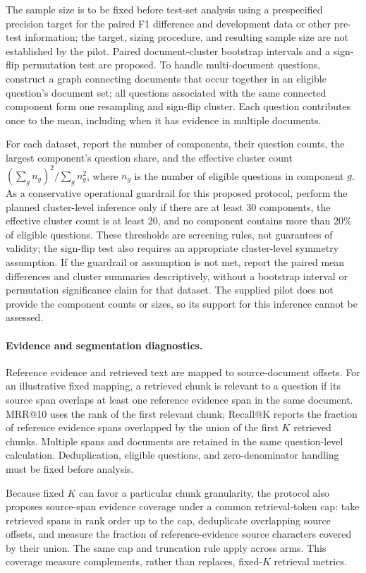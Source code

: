 \documentclass[10pt]{article}
\begin{document}
The sample size is to be fixed before test-set analysis using a prespecified precision target for the paired F1 difference and development data or other pre-test information; the target, sizing procedure, and resulting sample size are not established by the pilot. Paired document-cluster bootstrap intervals and a sign-flip permutation test are proposed. To handle multi-document questions, construct a graph connecting documents that occur together in an eligible question's document set; all questions associated with the same connected component form one resampling and sign-flip cluster. Each question contributes once to the mean, including when it has evidence in multiple documents.

For each dataset, report the number of components, their question counts, the largest component's question share, and the effective cluster count $(\sum_g n_g)^2/\sum_g n_g^2$, where $n_g$ is the number of eligible questions in component $g$. As a conservative operational guardrail for this proposed protocol, perform the planned cluster-level inference only if there are at least 30 components, the effective cluster count is at least 20, and no component contains more than 20\% of eligible questions. These thresholds are screening rules, not guarantees of validity; the sign-flip test also requires an appropriate cluster-level symmetry assumption. If the guardrail or assumption is not met, report the paired mean differences and cluster summaries descriptively, without a bootstrap interval or permutation significance claim for that dataset. The supplied pilot does not provide the component counts or sizes, so its support for this inference cannot be assessed.

\paragraph{Evidence and segmentation diagnostics.}
Reference evidence and retrieved text are mapped to source-document offsets. For an illustrative fixed mapping, a retrieved chunk is relevant to a question if its source span overlaps at least one reference evidence span in the same document. MRR@10 uses the rank of the first relevant chunk; Recall@K reports the fraction of reference evidence spans overlapped by the union of the first $K$ retrieved chunks. Multiple spans and documents are retained in the same question-level calculation. Deduplication, eligible questions, and zero-denominator handling must be fixed before analysis.

Because fixed $K$ can favor a particular chunk granularity, the protocol also proposes source-span evidence coverage under a common retrieval-token cap: take retrieved spans in rank order up to the cap, deduplicate overlapping source offsets, and measure the fraction of reference-evidence source characters covered by their union. The same cap and truncation rule apply across arms. This coverage measure complements, rather than replaces, fixed-$K$ retrieval metrics.
\end{document}
